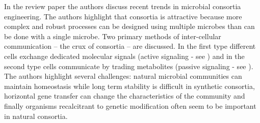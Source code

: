 \documentclass[float=false, crop=false]{standalone}
\begin{document}
	In the review paper \cite{Brenner2008} the authors discuss recent trends in microbial consortia engineering. The authors highlight that consortia is attractive because more complex and robust processes can be designed using multiple microbes than can be done with a single microbe. Two primary methods of inter-cellular communication -- the crux of consortia -- are discussed. In the first type different cells exchange dedicated molecular signals (active signaling - see \cite{Balagadde2008}) and in the second type cells communicate by trading metabolites (passive signaling - see \cite{Shou2007}). The authors highlight several challenges: natural microbial communities can maintain homeostasis while long term stability is difficult in synthetic consortia, horizontal gene transfer can change the characteristics of the community and finally organisms recalcitrant to genetic modification often seem to be important in natural consortia.

	\ifstandalone
			
		
	\fi
	
\end{document}
